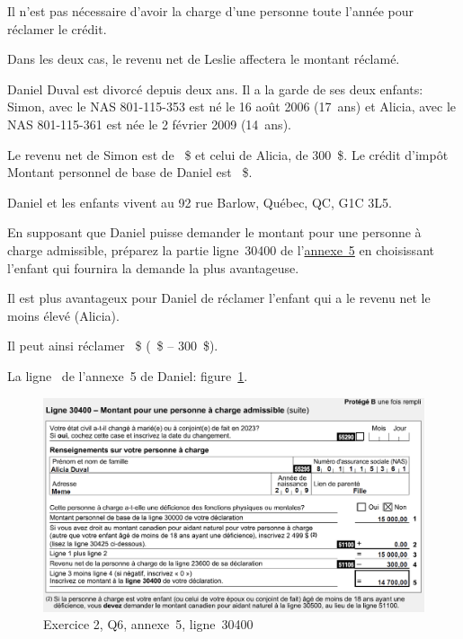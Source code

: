 Il n'est pas nécessaire d'avoir la charge d'une personne toute l'année pour réclamer le crédit.

Dans les deux cas, le revenu net de Leslie affectera le montant réclamé.

\begin{question}
	Daniel Duval est divorcé depuis deux ans. Il a la garde de ses deux enfants: Simon, avec le NAS 801-115-353 est né le 16 août 2006 (17~ans) et Alicia, avec le NAS 801-115-361 est née le 2 février 2009 (14~ans).
	
	Le revenu net de Simon est de ~\$ et celui de Alicia, de 300~\$. Le crédit d'impôt \og Montant personnel de base \fg{} de Daniel est ~\$.
	
	Daniel et les enfants vivent au 92 rue Barlow, Québec, QC, G1C 3L5.
	
	En supposant que Daniel puisse demander le montant pour une personne à charge admissible, préparez la partie ligne~30400 de l'\href{https://www.canada.ca/fr/agence-revenu/services/formulaires-publications/trousses-impot-toutes-annees-imposition/trousse-generale-impot-prestations/5000-s5.html}{annexe~5} en choisissant l'enfant qui fournira la demande la plus avantageuse.
\end{question}
Il est plus avantageux pour Daniel de réclamer l'enfant qui a le revenu net le moins élevé (Alicia).

Il peut ainsi réclamer ~\$ (~\$ – 300~\$).

La ligne~ \fg{} de l'annexe~5 de Daniel: figure~\ref{fig:chap4Exercice2Q6}.
\begin{figure}
	\centering
	\includegraphics[width=.9\textwidth]{exercice/4-2/Q6/30400.png}
	\caption[]{Exercice 2, Q6, annexe~5, ligne~30400}
	\label{fig:chap4Exercice2Q6}
\end{figure}

